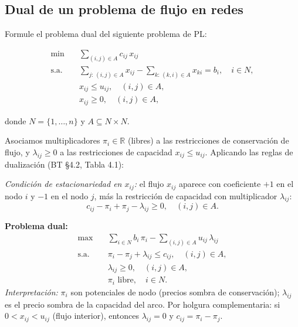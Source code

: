 \documentclass[12pt]{article}
\theoremstyle{plain}
\begin{document}
\bigskip

\subsection{Dual de un problema de flujo en redes}

Formule el problema dual del siguiente problema de PL:

\[
      \begin{aligned}
            \min\quad        & \sum_{(i,j)\in A} c_{ij}\,x_{ij}                                                   \\
            \text{s.a.}\quad & \sum_{j:\,(i,j)\in A} x_{ij} - \sum_{k:\,(k,i)\in A} x_{ki} = b_i, \quad i \in N, \\
                             & x_{ij} \leq u_{ij}, \quad (i,j) \in A,                                             \\
                             & x_{ij} \geq 0, \quad (i,j) \in A,
      \end{aligned}
\]

donde $N = \{1, \ldots, n\}$ y $A \subseteq N \times N$.

\begin{solucion}

Asociamos multiplicadores $\pi_i\in\mathbb{R}$ (libres) a las restricciones de conservación de flujo, y $\lambda_{ij}\geq 0$ a las restricciones de capacidad $x_{ij}\leq u_{ij}$. Aplicando las reglas de dualización (BT §4.2, Tabla 4.1):

\textit{Condición de estacionariedad en $x_{ij}$:} el flujo $x_{ij}$ aparece con coeficiente $+1$ en el nodo $i$ y $-1$ en el nodo $j$, más la restricción de capacidad con multiplicador $\lambda_{ij}$:
\[
c_{ij} - \pi_i + \pi_j - \lambda_{ij} \geq 0,\quad (i,j)\in A.
\]

\textbf{Problema dual:}
\[
\begin{aligned}
\max\quad & \sum_{i\in N}b_i\,\pi_i - \sum_{(i,j)\in A}u_{ij}\,\lambda_{ij} \\
\text{s.a.}\quad & \pi_i - \pi_j + \lambda_{ij} \leq c_{ij},\quad (i,j)\in A, \\
& \lambda_{ij} \geq 0,\quad (i,j)\in A, \\
& \pi_i \text{ libre},\quad i\in N.
\end{aligned}
\]
\textit{Interpretación:} $\pi_i$ son potenciales de nodo (precios sombra de conservación); $\lambda_{ij}$ es el precio sombra de la capacidad del arco. Por holgura complementaria: si $0<x_{ij}<u_{ij}$ (flujo interior), entonces $\lambda_{ij}=0$ y $c_{ij}=\pi_i-\pi_j$.

\end{solucion}
\end{document}
